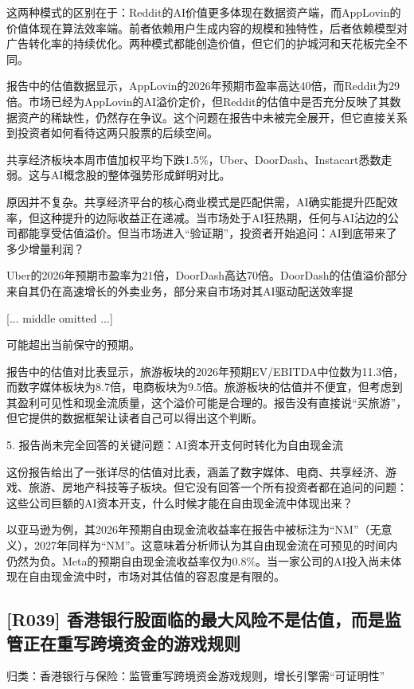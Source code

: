 \documentclass[11pt]{ctexart}
\begin{document}
这两种模式的区别在于：Reddit的AI价值更多体现在数据资产端，而AppLovin的价值体现在算法效率端。前者依赖用户生成内容的规模和独特性，后者依赖模型对广告转化率的持续优化。两种模式都能创造价值，但它们的护城河和天花板完全不同。

报告中的估值数据显示，AppLovin的2026年预期市盈率高达40倍，而Reddit为29倍。市场已经为AppLovin的AI溢价定价，但Reddit的估值中是否充分反映了其数据资产的稀缺性，仍然存在争议。这个问题在报告中未被完全展开，但它直接关系到投资者如何看待这两只股票的后续空间。

共享经济板块本周市值加权平均下跌1.5\%，Uber、DoorDash、Instacart悉数走弱。这与AI概念股的整体强势形成鲜明对比。

原因并不复杂。共享经济平台的核心商业模式是匹配供需，AI确实能提升匹配效率，但这种提升的边际收益正在递减。当市场处于AI狂热期，任何与AI沾边的公司都能享受估值溢价。但当市场进入“验证期”，投资者开始追问：AI到底带来了多少增量利润？

Uber的2026年预期市盈率为21倍，DoorDash高达70倍。DoorDash的估值溢价部分来自其仍在高速增长的外卖业务，部分来自市场对其AI驱动配送效率提

[... middle omitted ...]

可能超出当前保守的预期。

报告中的估值对比表显示，旅游板块的2026年预期EV/EBITDA中位数为11.3倍，而数字媒体板块为8.7倍，电商板块为9.5倍。旅游板块的估值并不便宜，但考虑到其盈利可见性和现金流质量，这个溢价可能是合理的。报告没有直接说“买旅游”，但它提供的数据框架让读者自己可以得出这个判断。

5. 报告尚未完全回答的关键问题：AI资本开支何时转化为自由现金流

这份报告给出了一张详尽的估值对比表，涵盖了数字媒体、电商、共享经济、游戏、旅游、房地产科技等子板块。但它没有回答一个所有投资者都在追问的问题：这些公司巨额的AI资本开支，什么时候才能在自由现金流中体现出来？

以亚马逊为例，其2026年预期自由现金流收益率在报告中被标注为“NM”（无意义），2027年同样为“NM”。这意味着分析师认为其自由现金流在可预见的时间内仍然为负。Meta的预期自由现金流收益率仅为0.8\%。当一家公司的AI投入尚未体现在自由现金流中时，市场对其估值的容忍度是有限的。

\subsection{[R039] 香港银行股面临的最大风险不是估值，而是监管正在重写跨境资金的游戏规则}
{\small\color{refgray}归类：香港银行与保险：监管重写跨境资金游戏规则，增长引擎需“可证明性”}
\end{document}
